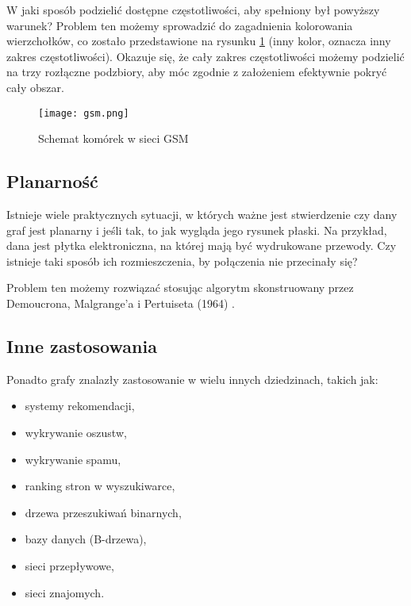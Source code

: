 W jaki sposób podzielić dostępne częstotliwości, aby spełniony był powyższy warunek? Problem ten możemy sprowadzić do zagadnienia kolorowania wierzchołków, co zostało przedstawione na rysunku \ref{fig:gsm} (inny kolor, oznacza inny zakres częstotliwości). Okazuje się, że cały zakres częstotliwości możemy podzielić na trzy rozłączne podzbiory, aby móc zgodnie z założeniem efektywnie pokryć cały obszar. 

\begin{figure}[H]
\caption{Schemat komórek w sieci GSM \cite{dharwadker}}\label{fig:gsm}
\centering
\texttt{[image: gsm.png]}
\end{figure}


\subsection*{Planarność}

Istnieje wiele praktycznych sytuacji, w których ważne jest stwierdzenie czy dany graf jest planarny i jeśli tak, to jak wygląda jego rysunek płaski. Na przykład, dana jest płytka elektroniczna, na której mają być wydrukowane przewody. Czy istnieje taki sposób ich rozmieszczenia, by połączenia nie przecinały się?

Problem ten możemy rozwiązać stosując algorytm skonstruowany przez Demoucrona, Malgrange'a i Pertuiseta (1964) \cite[163]{bondy}.


\subsection*{Inne zastosowania}

Ponadto grafy znalazły zastosowanie w wielu innych dziedzinach, takich jak:

\begin{itemize}
\setlength\itemsep{0em}
\item systemy rekomendacji,
\item wykrywanie oszustw,
\item wykrywanie spamu,
\item ranking stron w wyszukiwarce,
\item drzewa przeszukiwań binarnych,
\item bazy danych (B-drzewa),
\item sieci przepływowe,
\item sieci znajomych.
\end{itemize}
